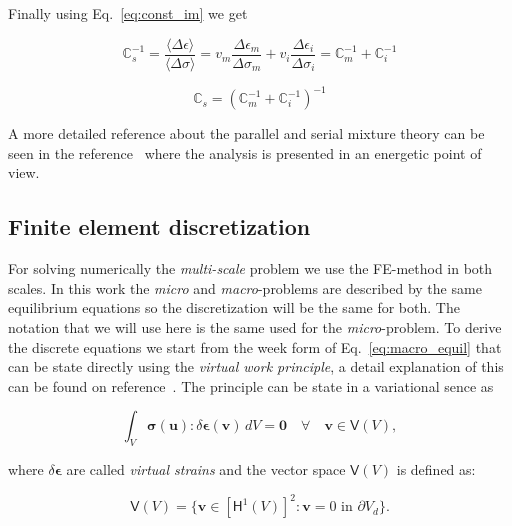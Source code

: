 \documentclass[3p]{elsarticle}
\begin{document}
Finally using Eq.~\ref{eq:const_im} we get

\begin{equation*}
\mathbb{C}_s^{-1} = \frac{\langle\Delta \epsilon\rangle}{\langle\Delta \sigma\rangle} = 
v_m\frac{\Delta \epsilon_m}{\Delta \sigma_m} +
v_i\frac{\Delta \epsilon_i}{\Delta \sigma_i} = 
\mathbb{C}_m^{-1} + \mathbb{C}_i^{-1}
\end{equation*}

\begin{equation}
\mathbb{C}_s =
\left( \mathbb{C}_m^{-1} + \mathbb{C}_i^{-1} \right)^{-1}
\label{eq:serial_mix}
\end{equation}

A more detailed reference about the parallel and serial mixture theory can be seen in the
reference~\cite{oller-composites} where the analysis is presented in an
energetic point of view.


\subsection{Finite element discretization}

For solving numerically the \emph{multi-scale} problem we use the
FE-method in both scales.
In this work the \emph{micro} and \emph{macro}-problems 
are described by the same equilibrium equations so the discretization will
be the same for both. The notation that we will use here is the same used for
the \emph{micro}-problem.
To derive the discrete equations we start from the week form
of Eq.~\ref{eq:macro_equil} that can be state directly using the \emph{virtual work
principle}, a detail explanation of this can be found on reference~\cite{bathe-virt-work}.
The principle can be state in a variational sence as

\begin{equation}
\int_V \bm{\sigma}(\bm{u}) : \delta \bm{\epsilon}(\bm{v})
\, dV = \bm{0} \quad \forall \quad \bm{v} \in \bm{\mathsf{V}}(V),
\end{equation}

\noindent
where $\delta \bm{\epsilon}$ are called \emph{virtual strains} and the vector
space $\bm{\mathsf{V}}(V)$ is defined as:

\begin{equation}
\bm{\mathsf{V}}(V) =
\{ 
  \bm{v} \in \left[\bm{\mathsf{H}}^1(V)\right]^2: \bm{v}=0 \text{ in } \partial V_d
\}.
\end{equation}
\end{document}
